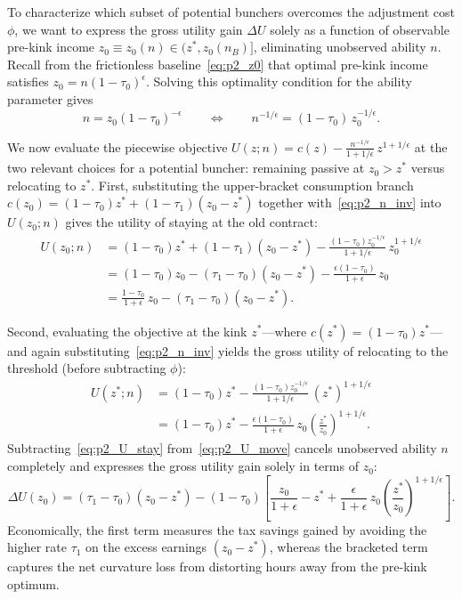 To characterize which subset of potential bunchers overcomes the adjustment cost $\phi$, we want to express the gross utility gain $\Delta U$ solely as a function of observable pre-kink income $z_0 \equiv z_0(n) \in (z^*, z_0(n_B)]$, eliminating unobserved ability $n$. Recall from the frictionless baseline~\eqref{eq:p2_z0} that optimal pre-kink income satisfies $z_0 = n(1-\tau_0)^\epsilon$. Solving this optimality condition for the ability parameter gives
\begin{equation}
n = z_0 (1-\tau_0)^{-\epsilon}
\qquad \Longleftrightarrow \qquad
n^{-1/\epsilon} = (1-\tau_0)\,z_0^{-1/\epsilon}.
\label{eq:p2_n_inv}
\end{equation}

We now evaluate the piecewise objective $U(z; n) = c(z) - \frac{n^{-1/\epsilon}}{1 + 1/\epsilon}\,z^{1 + 1/\epsilon}$ at the two relevant choices for a potential buncher: remaining passive at $z_0 > z^*$ versus relocating to $z^*$. First, substituting the upper-bracket consumption branch $c(z_0) = (1-\tau_0)z^* + (1-\tau_1)(z_0 - z^*)$ together with~\eqref{eq:p2_n_inv} into $U(z_0; n)$ gives the utility of staying at the old contract:
\begin{align}
U(z_0; n) &= (1-\tau_0)z^* + (1-\tau_1)(z_0 - z^*) - \frac{(1-\tau_0)z_0^{-1/\epsilon}}{1 + 1/\epsilon}\,z_0^{1 + 1/\epsilon} \nonumber\\
&= (1-\tau_0)z_0 - (\tau_1 - \tau_0)(z_0 - z^*) - \frac{\epsilon(1-\tau_0)}{1 + \epsilon}\,z_0 \nonumber\\
&= \frac{1-\tau_0}{1 + \epsilon}\,z_0 - (\tau_1 - \tau_0)(z_0 - z^*).
\label{eq:p2_U_stay}
\end{align}


Second, evaluating the objective at the kink $z^*$---where $c(z^*) = (1-\tau_0)z^*$---and again substituting~\eqref{eq:p2_n_inv} yields the gross utility of relocating to the threshold (before subtracting $\phi$):
\begin{align}
U(z^*; n) &= (1-\tau_0)z^* - \frac{(1-\tau_0)z_0^{-1/\epsilon}}{1 + 1/\epsilon}\,(z^*)^{1 + 1/\epsilon} \nonumber\\
&= (1-\tau_0)z^* - \frac{\epsilon(1-\tau_0)}{1 + \epsilon}\,z_0 \left(\frac{z^*}{z_0}\right)^{1 + 1/\epsilon}.
\label{eq:p2_U_move}
\end{align}
Subtracting~\eqref{eq:p2_U_stay} from~\eqref{eq:p2_U_move} cancels unobserved ability $n$ completely and expresses the gross utility gain solely in terms of $z_0$:
\begin{equation}
\Delta U(z_0) = (\tau_1 - \tau_0)(z_0 - z^*) - (1-\tau_0)\left[\frac{z_0}{1 + \epsilon} - z^* + \frac{\epsilon}{1 + \epsilon}\,z_0\left(\frac{z^*}{z_0}\right)^{1 + 1/\epsilon}\right].
\label{eq:p2_DeltaU}
\end{equation}
Economically, the first term measures the tax savings gained by avoiding the higher rate $\tau_1$ on the excess earnings $(z_0 - z^*)$, whereas the bracketed term captures the net curvature loss from distorting hours away from the pre-kink optimum.

